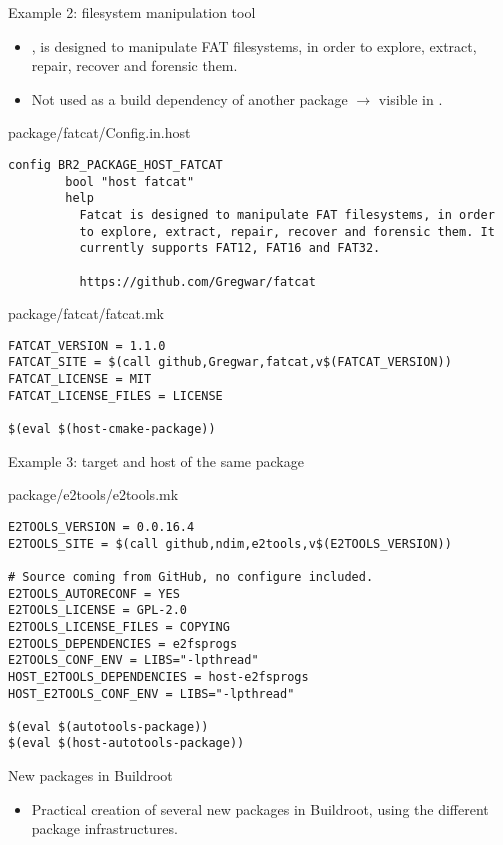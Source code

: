 \begin{frame}[fragile]{Example 2: filesystem manipulation tool}

  \begin{itemize}
  \item {}, is designed to manipulate FAT filesystems, in
    order to explore, extract, repair, recover and forensic them.
  \item Not used as a build dependency of another package
    $\rightarrow$ visible in .
  \end{itemize}
  \begin{block}{package/fatcat/Config.in.host}
    \tiny
\begin{verbatim}
config BR2_PACKAGE_HOST_FATCAT
        bool "host fatcat"
        help
          Fatcat is designed to manipulate FAT filesystems, in order
          to explore, extract, repair, recover and forensic them. It
          currently supports FAT12, FAT16 and FAT32.

          https://github.com/Gregwar/fatcat
\end{verbatim}
  \end{block}

  \begin{block}{package/fatcat/fatcat.mk}
    \begin{verbatim}
FATCAT_VERSION = 1.1.0
FATCAT_SITE = $(call github,Gregwar,fatcat,v$(FATCAT_VERSION))
FATCAT_LICENSE = MIT
FATCAT_LICENSE_FILES = LICENSE

$(eval $(host-cmake-package))
    \end{verbatim}
  \end{block}
\end{frame}

\begin{frame}[fragile]{Example 3: target and host of the same package}
  \begin{block}{package/e2tools/e2tools.mk}
    \begin{verbatim}
E2TOOLS_VERSION = 0.0.16.4
E2TOOLS_SITE = $(call github,ndim,e2tools,v$(E2TOOLS_VERSION))

# Source coming from GitHub, no configure included.
E2TOOLS_AUTORECONF = YES
E2TOOLS_LICENSE = GPL-2.0
E2TOOLS_LICENSE_FILES = COPYING
E2TOOLS_DEPENDENCIES = e2fsprogs
E2TOOLS_CONF_ENV = LIBS="-lpthread"
HOST_E2TOOLS_DEPENDENCIES = host-e2fsprogs
HOST_E2TOOLS_CONF_ENV = LIBS="-lpthread"

$(eval $(autotools-package))
$(eval $(host-autotools-package))
    \end{verbatim}
  \end{block}
\end{frame}

\setuplabframe
{New packages in Buildroot}
{
  \begin{itemize}
  \item Practical creation of several new packages in Buildroot, using
    the different package infrastructures.
  \end{itemize}
}
